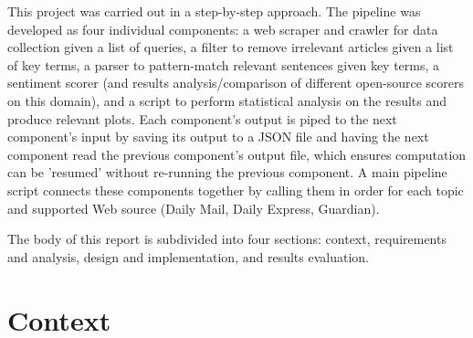 \documentclass{report}
\begin{document}
This project was carried out in a step-by-step approach. The pipeline was developed as four individual components: a web scraper and crawler for data collection given a list of queries, a filter to remove irrelevant articles given a list of key terms, a parser to pattern-match relevant sentences given key terms, a sentiment scorer (and results analysis/comparison of different open-source scorers on this domain), and a script to perform statistical analysis on the results and produce relevant plots. Each component's output is piped to the next component's input by saving its output to a JSON file and having the next component read the previous component's output file, which ensures computation can be 'resumed' without re-running the previous component. A main pipeline script connects these components together by calling them in order for each topic and supported Web source (Daily Mail, Daily Express, Guardian).

The body of this report is subdivided into four sections: context, requirements and analysis, design and implementation, and results evaluation.




\chapter{Context}  %



\end{document}
